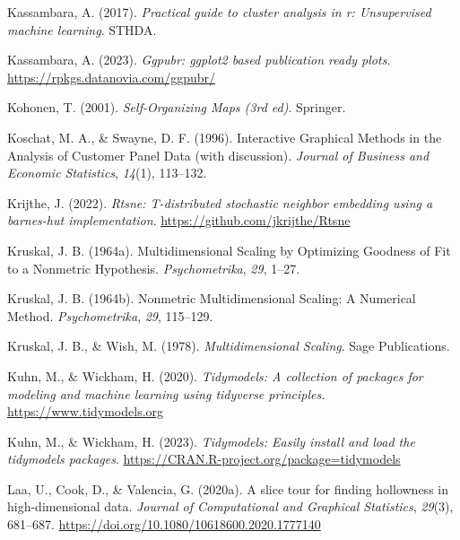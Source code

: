 \documentclass[
  letterpaper,
]{krantz}
\newlength{\cslhangindent}
\newlength{\cslentryspacingunit} %
\newenvironment{CSLReferences}[2] %
 {%
  \setlength{\parindent}{0pt}
  \ifodd #1
  \let\oldpar\par
  \def\par{\hangindent=\cslhangindent\oldpar}
  \fi
  \setlength{\parskip}{#2\cslentryspacingunit}
 }%
 {}
\begin{document}
\begin{CSLReferences}{1}{0}
\leavevmode{}%
Kassambara, A. (2017). \emph{Practical guide to cluster analysis in r:
Unsupervised machine learning}. STHDA.

\leavevmode{}%
Kassambara, A. (2023). \emph{Ggpubr: ggplot2 based publication ready
plots}. \url{https://rpkgs.datanovia.com/ggpubr/}

\leavevmode{}%
Kohonen, T. (2001). \emph{Self-{O}rganizing {M}aps (3rd ed)}. Springer.

\leavevmode{}%
Koschat, M. A., \& Swayne, D. F. (1996). Interactive {G}raphical
{M}ethods in the {A}nalysis of {C}ustomer {P}anel {D}ata (with
discussion). \emph{Journal of Business and Economic Statistics},
\emph{14}(1), 113--132.

\leavevmode{}%
Krijthe, J. (2022). \emph{Rtsne: T-distributed stochastic neighbor
embedding using a barnes-hut implementation}.
\url{https://github.com/jkrijthe/Rtsne}

\leavevmode{}%
Kruskal, J. B. (1964a). Multidimensional {S}caling by {O}ptimizing
{G}oodness of {F}it to a {N}onmetric {H}ypothesis. \emph{Psychometrika},
\emph{29}, 1--27.

\leavevmode{}%
Kruskal, J. B. (1964b). Nonmetric {M}ultidimensional {S}caling: A
{N}umerical {M}ethod. \emph{Psychometrika}, \emph{29}, 115--129.

\leavevmode{}%
Kruskal, J. B., \& Wish, M. (1978). \emph{Multidimensional {S}caling}.
Sage Publications.

\leavevmode{}%
Kuhn, M., \& Wickham, H. (2020). \emph{Tidymodels: A collection of
packages for modeling and machine learning using tidyverse principles.}
\url{https://www.tidymodels.org}

\leavevmode{}%
Kuhn, M., \& Wickham, H. (2023). \emph{Tidymodels: Easily install and
load the tidymodels packages}.
\url{https://CRAN.R-project.org/package=tidymodels}

\leavevmode{}%
Laa, U., Cook, D., \& Valencia, G. (2020a). A slice tour for finding
hollowness in high-dimensional data. \emph{Journal of Computational and
Graphical Statistics}, \emph{29}(3), 681--687.
\url{https://doi.org/10.1080/10618600.2020.1777140}


\end{CSLReferences}
\end{document}
